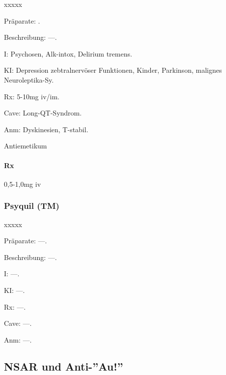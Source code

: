 \begin{labeling}[~]{xxxxx}
  \item[Präparate:]  .
  \item[Beschreibung:] ---.
  \item[I:]   Psychosen, Alk-intox, Delirium tremens.
  \item[KI:]   Depression zebtralnervöser Funktionen, Kinder, Parkinson,
malignes Neuroleptika-Sy.
  \item[Rx:]    5-10mg iv/im.
  \item[Cave:]   Long-QT-Syndrom.
  \item[Anm:]   Dyskinesien, T{\textdegree}-stabil.
\end{labeling}




 Antiemetikum

\paragraph{Rx} 0,5-1,0mg iv





\subsubsection{Psyquil (TM)}

\begin{labeling}[~]{xxxxx}
  \item[Präparate:]---.
  \item[Beschreibung:] ---.
  \item[I:] ---.
  \item[KI:] ---.
  \item[Rx:] ---.
  \item[Cave:] ---.
  \item[Anm:] ---.
\end{labeling} 



\subsection{NSAR und Anti-''Au!''}

